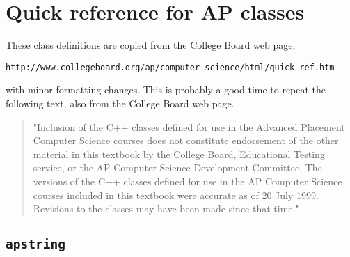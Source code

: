 

\chapter{Quick reference for AP classes}

These class definitions are copied from the College Board
web page,

\begin{verbatim}
http://www.collegeboard.org/ap/computer-science/html/quick_ref.htm
\end{verbatim}

with minor formatting changes.  This is probably a good time to
repeat the following text, also from the College Board web page.

\begin{quotation}
"Inclusion of the C++ classes defined for use in the Advanced
Placement Computer Science courses does not constitute endorsement of
the other material in this textbook by the College Board, Educational
Testing service, or the AP Computer Science Development Committee. The
versions of the C++ classes defined for use in the AP Computer Science
courses included in this textbook were accurate as of 20 July
1999.  Revisions to the classes may have been made since that time."
\end{quotation}

\section{{\tt apstring}}

